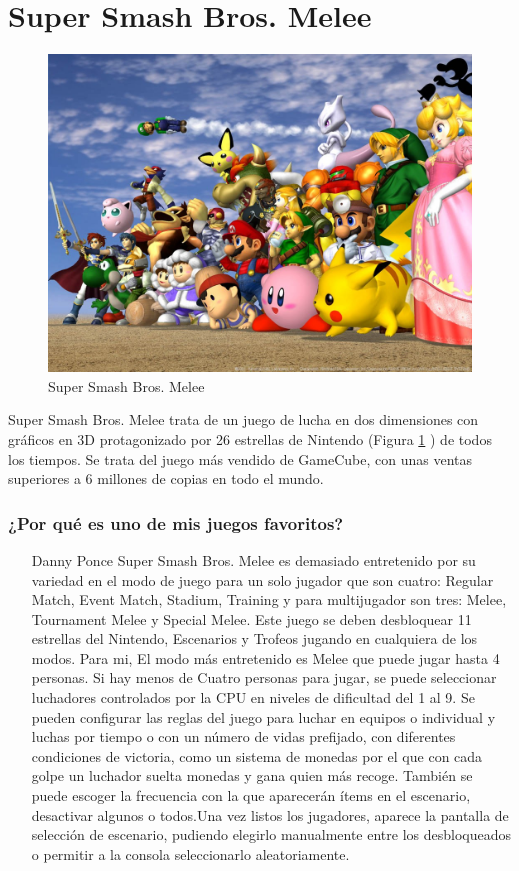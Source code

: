 \section{Super Smash Bros. Melee}

\begin{figure}[htbp]
\begin{center}
\includegraphics[width=.50\textwidth]{./imagenes/SuperSmashBrosMelee.jpg}
\caption{Super Smash Bros. Melee}
\label{Super Smash Bros. Melee}
\end{center}
\end{figure}
Super Smash Bros. Melee trata de un juego de lucha en dos dimensiones con gráficos en 3D protagonizado por 26 estrellas de Nintendo (Figura \ref{Super Smash Bros. Melee} ) de todos los tiempos. Se trata del juego más vendido de GameCube, con unas ventas superiores a 6 millones de copias en todo el mundo.

\subsubsection{¿Por qué es uno de mis juegos favoritos?}
\begin{itemize}
\item[Danny Ponce] Super Smash Bros. Melee es demasiado entretenido por su variedad en el modo de juego para un solo jugador que son cuatro: Regular Match, Event Match, Stadium, Training y para multijugador son tres: Melee, Tournament Melee y Special Melee. Este juego se deben desbloquear 11 estrellas del Nintendo, Escenarios y Trofeos jugando en cualquiera de los modos. Para mi, El modo más entretenido es Melee que puede jugar hasta 4 personas. Si hay menos de Cuatro personas para jugar, se puede seleccionar luchadores controlados por la CPU en niveles de dificultad del 1 al 9. Se pueden configurar las reglas del juego para luchar en equipos o individual y luchas por tiempo o con un número de vidas prefijado, con diferentes condiciones de victoria, como un sistema de monedas por el que con cada golpe un luchador suelta monedas y gana quien más recoge. También se puede escoger la frecuencia con la que aparecerán ítems en el escenario, desactivar algunos o todos.Una vez listos los jugadores, aparece la pantalla de selección de escenario, pudiendo elegirlo manualmente entre los desbloqueados o permitir a la consola seleccionarlo aleatoriamente.
\end{itemize}